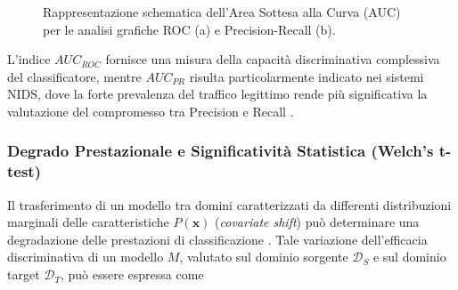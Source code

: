\begin{figure}[H]
    \caption{Rappresentazione schematica dell'Area Sottesa alla Curva (AUC) per le analisi grafiche ROC (a) e Precision-Recall (b).}
    \label{fig:curve_roc_pr}
\end{figure}

L'indice $AUC_{ROC}$ fornisce una misura della capacità discriminativa complessiva del classificatore, mentre $AUC_{PR}$ risulta particolarmente indicato nei sistemi NIDS, dove la forte prevalenza del traffico legittimo rende più significativa la valutazione del compromesso tra Precision e Recall \cite{saito2015}.

\subsubsection{Degrado Prestazionale e Significatività Statistica (Welch's t-test)}
\label{subsubsec:significativita_statistica}

Il trasferimento di un modello tra domini caratterizzati da differenti distribuzioni marginali delle caratteristiche $P(\mathbf{x})$ (\textit{covariate shift}) può determinare una degradazione delle prestazioni di classificazione \cite{pan2010}. Tale variazione dell'efficacia discriminativa di un modello $M$, valutato sul dominio sorgente $\mathcal{D}_S$ e sul dominio target $\mathcal{D}_T$, può essere espressa come

